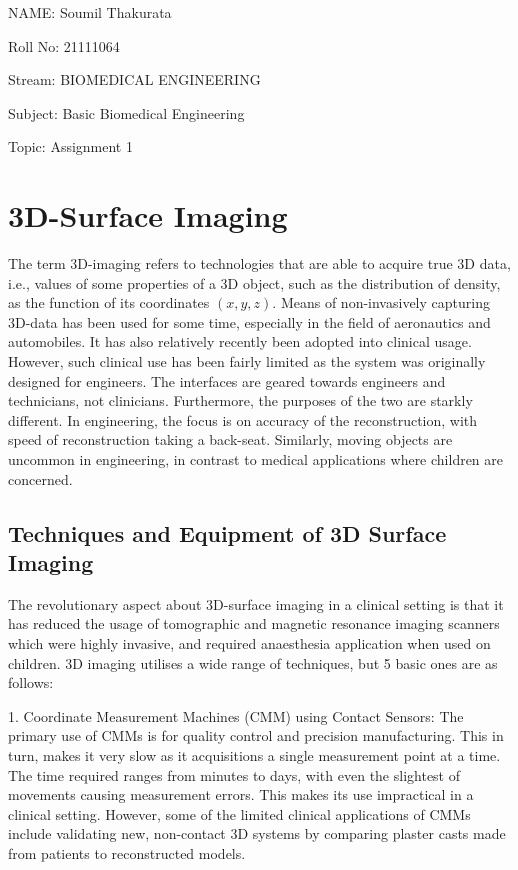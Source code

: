 \documentclass[11pt]{article}
\begin{document}
NAME: Soumil Thakurata

Roll No: 21111064

Stream: BIOMEDICAL ENGINEERING

Subject: Basic Biomedical Engineering

Topic: Assignment 1


\pagebreak
\section*{\centering 3D-Surface Imaging}

The term 3D-imaging refers to technologies that are able to acquire true 3D data, i.e., values of some properties of a 3D object, such as the distribution of density, as the function of its coordinates $(x,y,z)$. Means of non-invasively capturing 3D-data has been used for some time, especially in the field of aeronautics and automobiles. It has also relatively recently been adopted into clinical usage. However, such clinical use has been fairly limited as the system was originally designed for engineers. The interfaces are geared towards engineers and technicians, not clinicians. Furthermore, the purposes of the two are starkly different. In engineering, the focus is on accuracy of the reconstruction, with speed of reconstruction taking a back-seat. Similarly, moving objects are uncommon in engineering, in contrast to medical applications where children are concerned. 

\subsection*{Techniques and Equipment of 3D Surface Imaging}

The revolutionary aspect about 3D-surface imaging in a clinical setting is that it has reduced the usage of tomographic and magnetic resonance imaging scanners which were highly invasive, and required anaesthesia application when used on children. 3D imaging utilises a wide range of techniques, but 5 basic ones are as follows:

1. Coordinate Measurement Machines (CMM) using Contact Sensors: The primary use of CMMs is for quality control and precision manufacturing. This in turn, makes it very slow as it acquisitions a single measurement point at a time. The time required ranges from minutes to days, with even the slightest of movements causing measurement errors. This makes its use impractical in a clinical setting. However, some of the limited clinical applications of CMMs include validating new, non-contact 3D systems by comparing plaster casts made from patients to reconstructed models.
\end{document}
